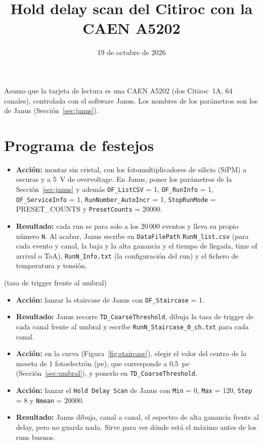 \documentclass[11pt,a4paper]{article}
\title{Hold delay scan del Citiroc con la CAEN A5202}
\author{}
\date{19 de octubre de 2026}
\begin{document}
\maketitle

\noindent Asumo que la tarjeta de lectura es una CAEN A5202 (dos Citiroc~1A, 64 canales),
controlada con el software Janus. Los nombres de los parámetros son los de
Janus (Sección~\ref{sec:janus}).

\section*{Programa de festejos}

\begin{itemize}
\item {\bf Acción:} montar sin cristal, con los fotomultiplicadores de
  silicio (SiPM) a oscuras y a 5~V de overvoltage. En Janus, poner los
  parámetros de la Sección~\ref{sec:janus} y además \texttt{OF\_ListCSV} = 1,
  \texttt{OF\_RunInfo} = 1, \texttt{OF\_ServiceInfo} = 1,
  \texttt{RunNumber\_AutoIncr} = 1, \texttt{StopRunMode} = PRESET\_COUNTS y
  \texttt{PresetCounts} = 20000.
\item {\bf Resultado:} cada run se para solo a los 20\,000 eventos y lleva su
  propio número \texttt{N}. Al acabar, Janus escribe en \texttt{DataFilePath}
  \texttt{RunN\_list.csv} (para cada evento y canal, la baja y la alta
  ganancia y el tiempo de llegada, time of arrival o ToA),
  \texttt{RunN\_Info.txt} (la configuración del run) y el fichero de
  temperatura y tensión.
\end{itemize}

 (tasa de trigger frente al umbral)
\begin{itemize}
\item {\bf Acción:} lanzar la staircase de Janus con \texttt{OF\_Staircase} = 1.
\item {\bf Resultado:} Janus recorre \texttt{TD\_CoarseThreshold}, dibuja la
  tasa de trigger de cada canal frente al umbral y escribe
  \texttt{RunN\_Staircase\_0\_ch.txt} para cada canal.
\item {\bf Acción:} en la curva (Figura~\ref{fig:staircase}), elegir el valor
  del centro de la meseta de 1 fotoelectrón (pe), que corresponde a 0,5~pe
  (Sección~\ref{sec:umbral}), y ponerlo en \texttt{TD\_CoarseThreshold}.
\end{itemize}

\begin{itemize}
\item {\bf Acción:} lanzar el \texttt{Hold Delay Scan} de Janus con
  \texttt{Min} = 0, \texttt{Max} = 120, \texttt{Step} = 8 y \texttt{Nmean} =
  20000.
\item {\bf Resultado:} Janus dibuja, canal a canal, el espectro de alta
  ganancia frente al delay, pero no guarda nada. Sirve para ver dónde está
  el máximo antes de los runs buenos.
\end{itemize}
\end{document}
